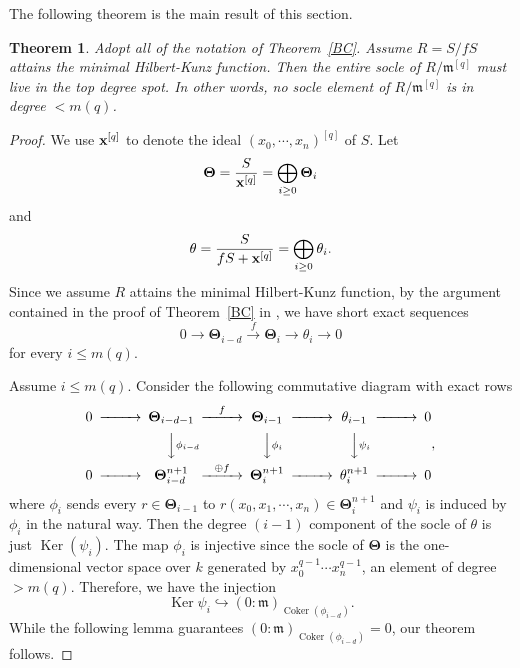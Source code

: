 \documentclass[draft]{amsart}
\newtheorem{theorem}{Theorem}[section]
\theoremstyle{definition}
\numberwithin{equation}{theorem}
\begin{document}
The following theorem is the main result of this section. 
\begin{theorem}
\label{main}
Adopt all of the notation of Theorem~\ref{BC}. Assume $R=S/fS$ attains the minimal Hilbert-Kunz function. Then the entire socle of $R/{\mathfrak{m}}^{[q]}$ must live in the top degree spot. In other words, no socle element of $R/{\mathfrak{m}}^{[q]}$ is in degree $< m(q)$.
\end{theorem}

\begin{proof}
We use $\bold x^{[q]}$ to denote the ideal $(x_0, \cdots, x_n)^{[q]}$ of $S$. Let
\[\boldsymbol{\Theta}=\dfrac{S}{\bold x^{[q]}}=\bigoplus_{i\geq 0} \boldsymbol{\Theta}_i\]
and
\[\theta=\dfrac{S}{fS+\bold x^{[q]}}=\bigoplus_{i\geq 0} \theta_i.\]
Since we assume $R$ attains the minimal Hilbert-Kunz function, by the argument contained in the proof of Theorem~\ref{BC} in \cite{BC}, we have short exact sequences
\begin{equation}\label{ses}
0 \to  \boldsymbol{\Theta}_{i-d} \overset{f}{\to} \boldsymbol{\Theta}_i \to \theta_i \to 0
\end{equation}
for every $i \leq m(q)$.

Assume $i \leq m(q)$. Consider the following commutative diagram with exact rows
\begin{equation}
\begin{CD}
0 @>>>\boldsymbol{\Theta}_{i-d-1}  @>f>>  \boldsymbol{\Theta}_{i-1} @>>> \theta_{i-1}@>>>0\\
@. @VV\phi_{i-d}V @VV\phi_iV @VV\psi_iV\\
0 @>>>\boldsymbol{\Theta}_{i-d}^{n+1}  @>\oplus f>>  \boldsymbol{\Theta}_{i}^{n+1} @>>>  \theta_{i}^{n+1}@>>>0
\end{CD},
\end{equation}
\noindent where $\phi_i$ sends every $r \in \boldsymbol{\Theta}_{i-1}$ to $r(x_0,x_1,\cdots, x_n) \in  \boldsymbol{\Theta}^{n+1}_i$ and $\psi_i$ is induced by $\phi_i $ in the natural way. Then the degree $(i-1)$ component of the socle of $\theta$ is just ${\mathop{\mathrm{Ker}}\nolimits}( \psi_i)$. The map $\phi_i$ is injective since the socle of $ \boldsymbol{\Theta}$ is the one-dimensional vector space over $k$ generated by $x_0^{q-1}\cdots x_n^{q-1}$, an element of degree $> m(q)$. Therefore, we have the injection 
\[{\mathop{\mathrm{Ker}}\nolimits}{\psi_i} \hookrightarrow (0:{\mathfrak{m}})_{{\mathop{\mathrm{Coker}}\nolimits} (\phi_{i-d})}.\]
While the following lemma guarantees $(0:{\mathfrak{m}})_{{\mathop{\mathrm{Coker}}\nolimits} (\phi_{i-d})}=0$, our theorem follows.
\end{proof}
\end{document}
